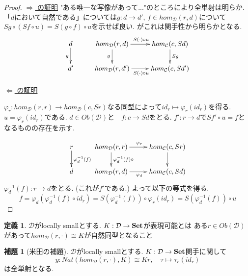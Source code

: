 \documentclass[dvipdfmx,a4paper,11pt]{report}
\theoremstyle{definition}
\newtheorem{lem}[thm]{補題}
\newtheorem{dfn}[thm]{定義}
\begin{document}
\begin{proof}
\underline{ $\Rightarrow$ の証明}
"ある唯一な写像があって..."のところにより全単射は明らか.
「$d$において自然である」については$g : d \to d'$, $f \in hom_{\mathcal{D}}(r,d) $について
$Sg \circ(Sf \circ u) = S(g \circ f) \circ u$を示せば良い. がこれは関手性から明らかとなる. 
\begin{equation*}
\xymatrix@C=25pt@R=20pt{
d\ar@{->}[d]_{g}
&hom_{\mathcal{D}}(r,d) \ar@{->}[d]_{g}  \ar@{->}[r]^{S(\cdot)\circ u}
 & hom_{\mathcal{C}}(c, Sd) \ar@{->}[d]^{Sg} \\
d' 
&hom_{\mathcal{D}}(r,d') \ar@{->}[r]_{S(\cdot)\circ u} 
& hom_{\mathcal{C}}(c, Sd')\\   
}
\end{equation*}

\underline{$\Leftarrow$  の証明}

$\varphi_{r} : hom_{\mathcal{D}}(r,r) \to hom_{\mathcal{D}}(c, Sr)$なる同型によって$id_r \mapsto \varphi_r(id_r)$を得る. $u=\varphi_r(id_r)$である. 
$d \in Ob(\mathcal{D})$と　$f : c\to Sd$をとる.
$f' : r \to d$で$Sf' \circ u =f$となるものの存在を示す.

\begin{equation*}
\xymatrix@C=25pt@R=20pt{
r\ar@{->}[d]^{\varphi_{d}^{-1}(f) }&
hom_{\mathcal{D}}(r,r) \ar@{->}[d]^{\varphi_{d}^{-1}(f) \circ }  \ar@{->}[r]^{\varphi_{r} }
 & hom_{\mathcal{C}}(c, Sr) \ar@{->}[d]\\
 d &
hom_{\mathcal{D}}(r,d) \ar@{->}[r]_{\varphi_{d} }
& hom_{\mathcal{C}}(c, Sd)\\   
}
\end{equation*}
$\varphi_{d}^{-1}(f) : r \to d$をとる. (これが$f'$である.)
よって以下の等式を得る.
$$
f =  \varphi_{d}(\varphi_{d}^{-1}(f) \circ id_{r})
= S(\varphi_{d}^{-1}(f)) \circ  \varphi_{r}(id_{r})
= S(\varphi_{d}^{-1}(f)) \circ u
$$

\end{proof}


 \begin{tcolorbox}
 [colback = white, colframe = green!35!black, fonttitle = \bfseries,breakable = true]
\begin{dfn}
$\mathcal{D} $がlocally smallとする. 
$K : \mathcal{D} \to {\bf Set}$が表現可能とは
ある$r \in Ob(\mathcal{D})$があって$hom_{\mathcal{D}}(r, \cdot) \cong K$が自然同型となること
\end{dfn}
\end{tcolorbox}


 \begin{tcolorbox}
 [colback = white, colframe = green!35!black, fonttitle = \bfseries,breakable = true]
\begin{lem}[米田の補題]
$\mathcal{D} $がlocally smallとする. 
$K : \mathcal{D} \to {\bf Set}$関手に関して
$$
y : Nat(hom_{\mathcal{D}}(r, \cdot), K) \cong Kr, \quad  \tau \mapsto\tau_{r}(id_{r})
$$
は全単射となる. 
\end{lem}
\end{tcolorbox}
\end{document}
